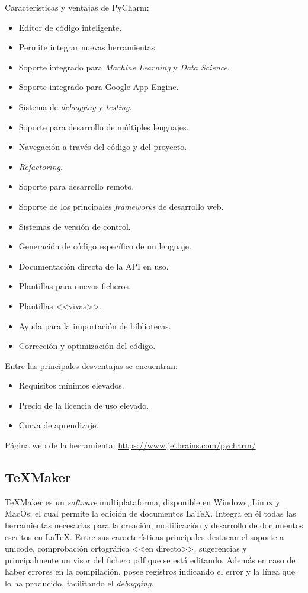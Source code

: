 Características y ventajas de PyCharm:
\begin{itemize}
\item Editor de código inteligente. 
\item Permite integrar nuevas herramientas.
\item Soporte integrado para \textit{Machine Learning} y \textit{Data Science}.
\item Soporte integrado para Google App Engine.
\item Sistema de \textit{debugging} y \textit{testing}.
\item Soporte para desarrollo de múltiples lenguajes.
\item Navegación a través del código y del proyecto.
\item \textit{Refactoring}.
\item Soporte para desarrollo remoto.
\item Soporte de los principales \textit{frameworks} de desarrollo web.
\item Sistemas de versión de control.
\item Generación de código específico de un lenguaje.
\item Documentación directa de la API en uso.
\item Plantillas para nuevos ficheros.
\item Plantillas <<vivas>>.
\item Ayuda para la importación de bibliotecas.
\item Corrección y optimización del código.
\end{itemize}

Entre las principales desventajas se encuentran:
\begin{itemize}
\item Requisitos mínimos elevados. 
\item Precio de la licencia de uso elevado.
\item Curva de aprendizaje.
\end{itemize}

Página web de la herramienta: \url{https://www.jetbrains.com/pycharm/}

\subsection{\TeX Maker}
\TeX Maker es un \textit{software} multiplataforma, disponible en Windows, Linux y MacOs; el cual permite la edición de documentos \LaTeX. Integra en él todas las herramientas necesarias para la creación, modificación y desarrollo de documentos escritos en \LaTeX. Entre sus características principales destacan el soporte a unicode, comprobación ortográfica <<en directo>>, sugerencias y principalmente un visor del fichero pdf que se está editando. Además en caso de haber errores en la compilación, posee registros indicando el error y la línea que lo ha producido, facilitando el \textit{debugging}.

